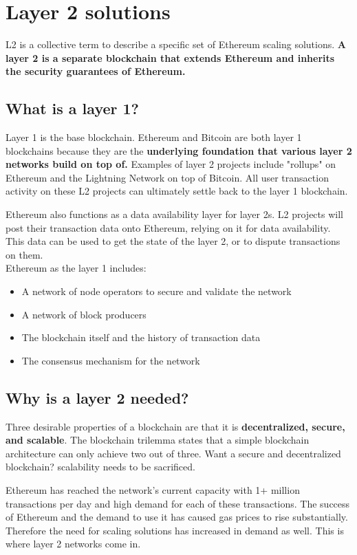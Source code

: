 \documentclass[MSE,Master,english]{twbook}%
\begin{document}
\section{Layer 2 solutions\label{layer2}}
\ac{L2}\cite{l2} is a collective term to describe a specific set of Ethereum scaling solutions. \textbf{A layer 2 is a separate blockchain that extends Ethereum and inherits the security guarantees of Ethereum.}

\subsection{What is a layer 1?}
Layer 1 is the base blockchain. Ethereum and Bitcoin are both layer 1 blockchains because they are the \textbf{underlying foundation that various layer 2 networks build on top of.} Examples of layer 2 projects include "rollups" on Ethereum and the Lightning Network on top of Bitcoin. All user transaction activity on these \ac{L2} projects can ultimately settle back to the layer 1 blockchain.

Ethereum also functions as a data availability layer for layer 2s. \ac{L2} projects will post their transaction data onto Ethereum, relying on it for data availability. This data can be used to get the state of the layer 2, or to dispute transactions on them. \\

Ethereum as the layer 1 includes:

\begin{itemize}
  \item A network of node operators to secure and validate the network
  \item A network of block producers
  \item The blockchain itself and the history of transaction data
  \item The consensus mechanism for the network
\end{itemize}

\subsection{Why is a layer 2 needed?}
Three desirable properties of a blockchain are that it is \textbf{decentralized, secure, and scalable}. The blockchain trilemma states that a simple blockchain architecture can only achieve two out of three. Want a secure and decentralized blockchain? scalability needs to be sacrificed.

Ethereum has reached the network's current capacity with 1+ million transactions per day and high demand for each of these transactions. The success of Ethereum and the demand to use it has caused gas prices to rise substantially. Therefore the need for scaling solutions has increased in demand as well. This is where layer 2 networks come in. \\
\end{document}

